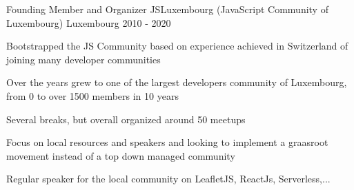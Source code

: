 

\begin{cventries}

  \cventry
    {Founding Member and Organizer} %
    {JSLuxembourg (JavaScript Community of Luxembourg) } %
    {Luxembourg} %
    {2010 - 2020} %
    {
      \begin{cvitems} %
        \item {Bootstrapped the JS Community based on experience achieved in Switzerland of joining many developer communities}
        \item {Over the years grew to one of the largest developers community of Luxembourg, from 0 to over 1500 members in 10 years}
        \item {Several breaks, but overall organized around 50 meetups}
        \item {Focus on local resources and speakers and looking to implement a graasroot movement instead of a top down managed community}
        \item {Regular speaker for the local community on LeafletJS, ReactJs, Serverless,...}
      \end{cvitems}
    }

\end{cventries}
